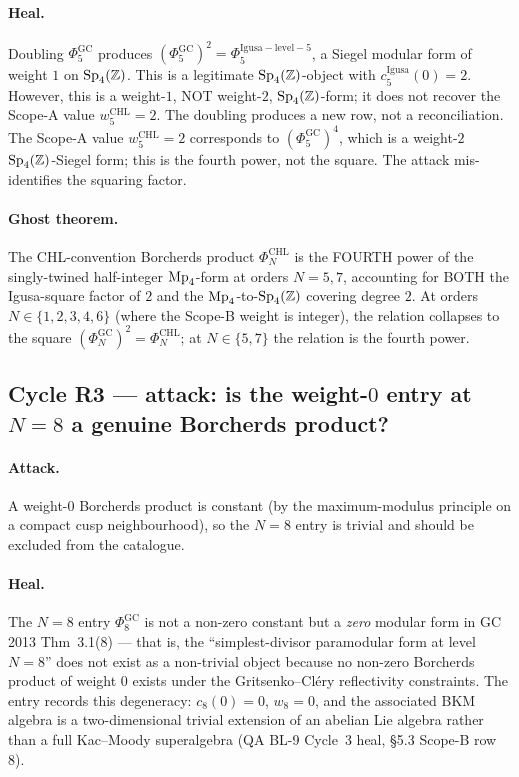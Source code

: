 \paragraph{Heal.} Doubling $\Phi_5^{\mathrm{GC}}$ produces
$(\Phi_5^{\mathrm{GC}})^2 = \Phi_5^{\mathrm{Igusa-level-5}}$, a Siegel
modular form of weight $1$ on $\mathrm{Sp}_4(\mathbb Z)$. This is a legitimate
$\mathrm{Sp}_4(\mathbb Z)$-object with $c_5^{\mathrm{Igusa}}(0) = 2$. However, this
is a weight-$1$, NOT weight-$2$, $\mathrm{Sp}_4(\mathbb Z)$-form; it does not recover
the Scope-A value $w_5^{\mathrm{CHL}} = 2$. The doubling produces a
new row, not a reconciliation. The Scope-A value $w_5^{\mathrm{CHL}}
= 2$ corresponds to $(\Phi_5^{\mathrm{GC}})^4$, which is a
weight-$2$ $\mathrm{Sp}_4(\mathbb Z)$-Siegel form; this is the fourth power, not the
square. The attack mis-identifies the squaring factor.

\paragraph{Ghost theorem.} The CHL-convention Borcherds product
$\Phi_N^{\mathrm{CHL}}$ is the FOURTH power of the singly-twined
half-integer $\mathrm{Mp}_4$-form at orders $N = 5, 7$, accounting for BOTH
the Igusa-square factor of $2$ and the $\mathrm{Mp}_4$-to-$\mathrm{Sp}_4(\mathbb Z)$
covering degree $2$. At orders $N \in \{1, 2, 3, 4, 6\}$ (where the
Scope-B weight is integer), the relation collapses to the square
$(\Phi_N^{\mathrm{GC}})^2 = \Phi_N^{\mathrm{CHL}}$; at $N \in \{5, 7\}$
the relation is the fourth power.

\subsection*{Cycle R3 --- attack: is the weight-$0$ entry at $N = 8$
a genuine Borcherds product?}

\paragraph{Attack.} A weight-$0$ Borcherds product is constant (by the
maximum-modulus principle on a compact cusp neighbourhood), so the
$N = 8$ entry is trivial and should be excluded from the catalogue.

\paragraph{Heal.} The $N = 8$ entry $\Phi_8^{\mathrm{GC}}$ is not a
non-zero constant but a \emph{zero} modular form in GC 2013 Thm~3.1(8)
--- that is, the ``simplest-divisor paramodular form at level $N = 8$''
does not exist as a non-trivial object because no non-zero Borcherds
product of weight $0$ exists under the Gritsenko--Cl\'ery reflectivity
constraints. The entry records this degeneracy: $c_8(0) = 0$, $w_8 =
0$, and the associated BKM algebra is a two-dimensional trivial
extension of an abelian Lie algebra rather than a full Kac--Moody
superalgebra (QA BL-9 Cycle~3 heal, \S 5.3 Scope-B row 8).

